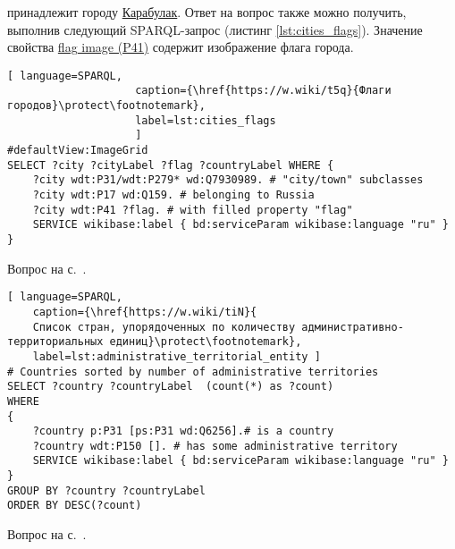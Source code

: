 \begin{task}
    \label{answer:cities_flags}
     принадлежит городу \href{https://w.wiki/oLF}{Карабулак}. Ответ на вопрос также можно получить, выполнив следующий SPARQL-запрос (листинг \ref{lst:cities_flags}). Значение свойства \href{https://www.wikidata.org/wiki/Property:P41}{flag image (P41)} содержит изображение флага города.
    
    \begin{lstlisting}[ language=SPARQL, 
                    caption={\href{https://w.wiki/t5q}{Флаги городов}\protect\footnotemark},
                    label=lst:cities_flags
                    ]
#defaultView:ImageGrid
SELECT ?city ?cityLabel ?flag ?countryLabel WHERE {
	?city wdt:P31/wdt:P279* wd:Q7930989. # "city/town" subclasses
	?city wdt:P17 wd:Q159. # belonging to Russia	
	?city wdt:P41 ?flag. # with filled property "flag"
	SERVICE wikibase:label { bd:serviceParam wikibase:language "ru" }
}
\end{lstlisting}
    
    \small{Вопрос на с.~\pageref{lst:countries_sister_cities_with_Russia}.}
\end{task}


\begin{task}
	\label{answer:administrative_territorial}
	
	\begin{lstlisting}[ language=SPARQL, 
	caption={\href{https://w.wiki/tiN}{
	Список стран, упорядоченных по количеству административно-территориальных единиц}\protect\footnotemark},
	label=lst:administrative_territorial_entity	]
# Countries sorted by number of administrative territories
SELECT ?country ?countryLabel  (count(*) as ?count)
WHERE
{
	?country p:P31 [ps:P31 wd:Q6256].# is a country
	?country wdt:P150 []. # has some administrative territory
	SERVICE wikibase:label { bd:serviceParam wikibase:language "ru" }
}
GROUP BY ?country ?countryLabel
ORDER BY DESC(?count)
	\end{lstlisting}
	
	\small{Вопрос на с.~\pageref{lst:age_of_country}.}
\end{task}

